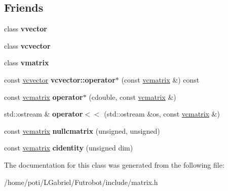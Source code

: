 \subsection*{Friends}
\begin{DoxyCompactItemize}
\item 
class {\bfseries vvector}\hypertarget{classvcmatrix_a15049ecbebd7aeaf58b17c60666ef8f6}{}\label{classvcmatrix_a15049ecbebd7aeaf58b17c60666ef8f6}

\item 
class {\bfseries vcvector}\hypertarget{classvcmatrix_a57a5699049f52275a82ce9168124f639}{}\label{classvcmatrix_a57a5699049f52275a82ce9168124f639}

\item 
class {\bfseries vmatrix}\hypertarget{classvcmatrix_ac6d075ce0dd9269d283dd58eac5d8e75}{}\label{classvcmatrix_ac6d075ce0dd9269d283dd58eac5d8e75}

\item 
const \hyperlink{classvcvector}{vcvector} {\bfseries vcvector\+::operator$\ast$} (const \hyperlink{classvcmatrix}{vcmatrix} \&) const \hypertarget{classvcmatrix_a6608431436e166aa787f97e0f9c36d76}{}\label{classvcmatrix_a6608431436e166aa787f97e0f9c36d76}

\item 
const \hyperlink{classvcmatrix}{vcmatrix} {\bfseries operator$\ast$} (cdouble, const \hyperlink{classvcmatrix}{vcmatrix} \&)\hypertarget{classvcmatrix_afb900a1b8540989eee7d3da0962149fd}{}\label{classvcmatrix_afb900a1b8540989eee7d3da0962149fd}

\item 
std\+::ostream \& {\bfseries operator$<$$<$} (std\+::ostream \&os, const \hyperlink{classvcmatrix}{vcmatrix} \&)\hypertarget{classvcmatrix_a579ac4b5070fbc56ba1534de195ee642}{}\label{classvcmatrix_a579ac4b5070fbc56ba1534de195ee642}

\item 
const \hyperlink{classvcmatrix}{vcmatrix} {\bfseries nullcmatrix} (unsigned, unsigned)\hypertarget{classvcmatrix_a97a9d67b323cf636c70294c4fe4c3539}{}\label{classvcmatrix_a97a9d67b323cf636c70294c4fe4c3539}

\item 
const \hyperlink{classvcmatrix}{vcmatrix} {\bfseries cidentity} (unsigned dim)\hypertarget{classvcmatrix_ab9d0693652ac952152b61e9ec44c3c8e}{}\label{classvcmatrix_ab9d0693652ac952152b61e9ec44c3c8e}

\end{DoxyCompactItemize}


The documentation for this class was generated from the following file\+:\begin{DoxyCompactItemize}
\item 
/home/poti/\+L\+Gabriel/\+Futrobot/include/matrix.\+h\end{DoxyCompactItemize}
